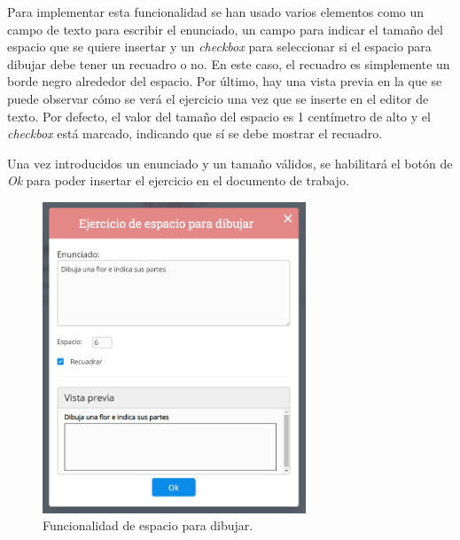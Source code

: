 Para implementar esta funcionalidad se han usado varios elementos como un campo de texto para escribir el enunciado, un campo para indicar el tamaño del espacio que se quiere insertar y un \textit{checkbox} para seleccionar si el espacio para dibujar debe tener un recuadro o no. En este caso, el recuadro es simplemente un borde negro alrededor del espacio. Por último, hay una vista previa en la que se puede observar cómo se verá el ejercicio una vez que se inserte en el editor de texto. Por defecto, el valor del tamaño del espacio es 1 centímetro de alto y el \textit{checkbox} está marcado, indicando que sí se debe mostrar el recuadro.

Una vez introducidos un enunciado y un tamaño válidos, se habilitará el botón de \textit{Ok} para poder insertar el ejercicio en el documento de trabajo.


\begin{figure}[ht!]
  \centering
  \includegraphics[width=0.7\textwidth]{Imagenes/Funcionalidades/EspacioParaDibujar.PNG}
  \caption{Funcionalidad de espacio para dibujar.}
  \label{fig:funcionalidadEspacioParaDibujar}
\end{figure}



